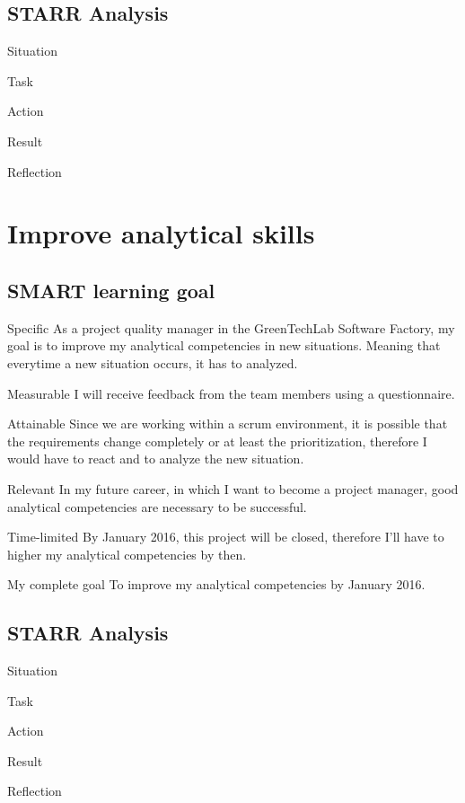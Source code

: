\documentclass[12pt]{article}
\begin{document}
	\subsection{STARR Analysis}
	\begin{STARR}
	    \item[Situation]
	    \item[Task]
	    \item[Action]
	    \item[Result]
	    \item[Reflection]
	\end{STARR}
	
	\section{Improve analytical skills}
	
	\subsection{SMART learning goal}
	\begin{SMART}
	    \item[Specific] As a project quality manager in the GreenTechLab Software Factory, my goal is to improve my analytical competencies in new situations. Meaning that everytime a new situation occurs, it has to analyzed.
	    \item[Measurable] I will receive feedback from the team members using a questionnaire.
	    \item[Attainable] Since we are working within a scrum environment, it is possible that the requirements change completely or at least the prioritization, therefore I would have to react and to analyze the new situation.
	    \item[Relevant] In my future career, in which I want to become a project manager, good analytical competencies are necessary to be successful.
	    \item[Time-limited] By January 2016, this project will be closed, therefore I’ll have to higher my analytical competencies by then.
	    \item[My complete goal] To improve my analytical competencies by January 2016.
	\end{SMART}
	
	\subsection{STARR Analysis}
	\begin{STARR}
	    \item[Situation]
	    \item[Task]
	    \item[Action]
	    \item[Result]
	    \item[Reflection]
	\end{STARR}
	
	
	
	
	
\end{document}
